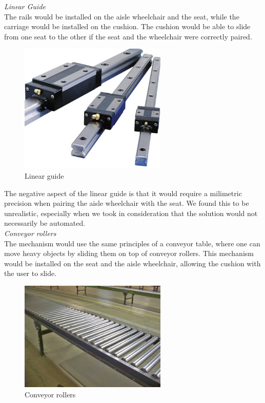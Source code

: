 \noindent\emph{Linear Guide}\\
The rails would be installed on the aisle wheelchair and the seat, while the carriage would be installed on the cushion. The cushion would be able to slide from one seat to the other if the seat and the wheelchair were correctly paired.

\begin{figure}[h]
\centering
\includegraphics[width=7cm]{brazil_images/image035.jpg}
\caption{Linear guide} %
\label{fig:linear_guide}
\end{figure}

The negative aspect of the linear guide is that it would require a milimetric precision when pairing the aisle wheelchair with the seat. We found this to be unrealistic, especially when we took in consideration that the solution would not necessarily be automated.\\

\noindent\emph{Conveyor rollers}\\
The mechanism would use the same principles of a conveyor table, where one can move heavy objects by sliding them on top of conveyor rollers. This mechanism would be installed on the seat and the aisle wheelchair, allowing the cushion with the user to slide.

\begin{figure}[h]
\centering
\includegraphics[width=7cm]{brazil_images/image036.jpg}
\caption{Conveyor rollers} %
\label{fig:conveyor_rollers}
\end{figure}


